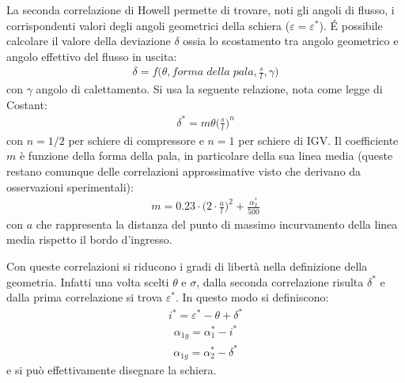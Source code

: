 La seconda correlazione di Howell permette di trovare, noti gli angoli di flusso, i corrispondenti valori degli angoli geometrici della schiera ($\varepsilon = \varepsilon^*$). \'E possibile calcolare il valore della deviazione $\delta$ ossia lo scostamento tra angolo geometrico e angolo effettivo del flusso in uscita:
\begin{align*}
\delta = f \bigg( \theta, forma \; della \; pala, \frac{s}{l}, \gamma \bigg)
\end{align*}
con $\gamma$ angolo di calettamento. Si usa la seguente relazione, nota come legge di Costant:
\begin{align*}
\boxed{\delta^* = m \theta \bigg( \frac{s}{l} \bigg)^n}
\end{align*}
con $n = 1/2$ per schiere di compressore e $n = 1$ per schiere di IGV. Il coefficiente $m$ è funzione della forma della pala, in particolare della sua linea media (queste restano comunque delle correlazioni approssimative visto che derivano da osservazioni sperimentali):
\begin{align*}
m = 0.23 \cdot \bigg( 2 \cdot \frac{a}{l} \bigg)^2 + \frac{\alpha_2^*}{500}
\end{align*}
con $a$ che rappresenta la distanza del punto di massimo incurvamento della linea media rispetto il bordo d'ingresso. 

Con queste correlazioni si riducono i gradi di libertà nella definizione della geometria. Infatti una volta scelti $ \theta$ e $\sigma $, dalla seconda correlazione risulta $ \delta^* $ e dalla prima correlazione si trova $ \varepsilon^* $. In questo modo si definiscono:
\begin{align*}
i^* = \varepsilon^* - \theta + \delta^*
\end{align*}
\begin{align*}
\alpha_{1g} = \alpha_1^* - i^*
\end{align*}
\begin{align*}
\alpha_{1g} = \alpha_2^* - \delta^*
\end{align*}
e si può effettivamente disegnare la schiera. 

